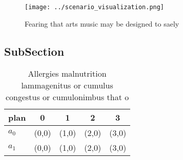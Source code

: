 \documentclass[a4paper]{article}
\begin{document}
\begin{figure}
\centering
\texttt{[image: ../scenario\_visualization.png]}
\caption{Fearing that arts music may be designed to saely 
}
\end{figure}
 
\subsection{SubSection}

\begin{table}
\begin{adjustbox}{width=0.5\columnwidth}
\begin{tabular}{|l|l|l|l|l|}
\hline
\textbf{plan} & \multicolumn{1}{c|}{\textbf{0}} & \multicolumn{1}{c|}{\textbf{1}} & \multicolumn{1}{c|}{\textbf{2}} & \multicolumn{1}{c|}{\textbf{3}} \\ \hline
\textbf{$a_0$}  & (0,0) & (1,0) & (2,0) & (3,0) \\ \hline
\textbf{$a_1$}  & (0,0) & (1,0) & (2,0) & (3,0) \\ \hline
\end{tabular}
\end{adjustbox}
\caption{Allergies malnutrition lammagenitus or cumulus congestus or cumulonimbus that o
}
\end{table}
\end{document}
